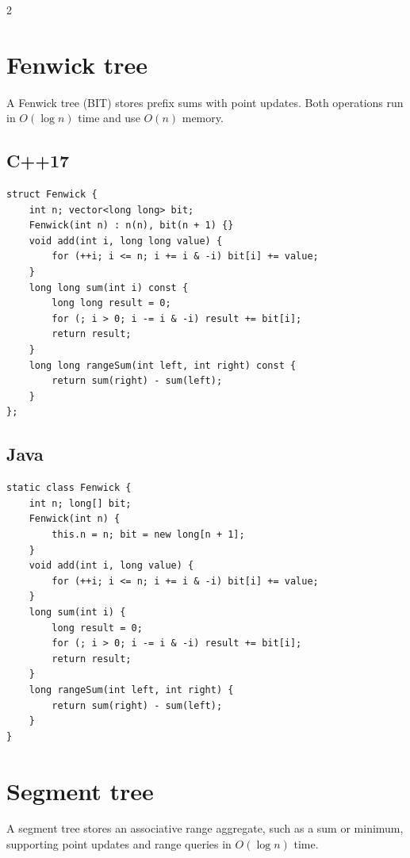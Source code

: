 \documentclass[10pt]{article}
\begin{document}
\begin{multicols}{2}

\section{Fenwick tree}
A Fenwick tree (BIT) stores prefix sums with point updates.
Both operations run in $O(\log n)$ time and use $O(n)$ memory.

\subsection{C++17}
\begin{framed}
\scriptsize
\begin{verbatim}
struct Fenwick {
    int n; vector<long long> bit;
    Fenwick(int n) : n(n), bit(n + 1) {}
    void add(int i, long long value) {
        for (++i; i <= n; i += i & -i) bit[i] += value;
    }
    long long sum(int i) const {
        long long result = 0;
        for (; i > 0; i -= i & -i) result += bit[i];
        return result;
    }
    long long rangeSum(int left, int right) const {
        return sum(right) - sum(left);
    }
};
\end{verbatim}
\end{framed}

\subsection{Java}
\begin{framed}
\scriptsize
\begin{verbatim}
static class Fenwick {
    int n; long[] bit;
    Fenwick(int n) {
        this.n = n; bit = new long[n + 1];
    }
    void add(int i, long value) {
        for (++i; i <= n; i += i & -i) bit[i] += value;
    }
    long sum(int i) {
        long result = 0;
        for (; i > 0; i -= i & -i) result += bit[i];
        return result;
    }
    long rangeSum(int left, int right) {
        return sum(right) - sum(left);
    }
}
\end{verbatim}
\end{framed}

\columnbreak
\section{Segment tree}
A segment tree stores an associative range aggregate, such as a sum or
minimum, supporting point updates and range queries in $O(\log n)$ time.


\end{multicols}
\end{document}
